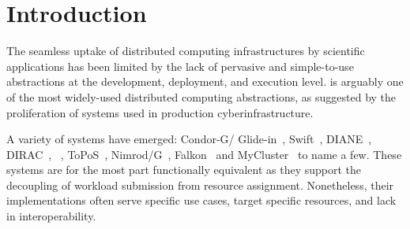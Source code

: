 \documentclass{sig-alternate}
\begin{document}
\begin{abstract}
\end{abstract}

\section{Introduction}
\label{sec:intro}


The seamless uptake of distributed computing infrastructures by scientific
applications has been limited by the lack of pervasive and simple-to-use
abstractions at the development, deployment, and execution level. \pilotjob is
arguably one of the most widely-used distributed computing abstractions, as
suggested by the proliferation of \pilotjob systems used in production
cyberinfrastructure.

A variety of \pilotjob systems have emerged: Condor-G/
Glide-in~\cite{condor-g}, Swift~\cite{Wilde2011}, DIANE~\cite{Moscicki:908910},
DIRAC~\cite{1742-6596-219-6-062049}, \panda~\cite{1742-6596-219-6-062041},
ToPoS~\cite{topos}, Nimrod/G~\cite{10.1109/HPC.2000.846563},
Falkon~\cite{1362680} and MyCluster~\cite{1652061} to name a few. These
systems are for the most part functionally equivalent as they support the
decoupling of workload submission from resource assignment. Nonetheless, their
implementations often serve specific use cases, target specific resources, and
lack in interoperability.
\end{document}
